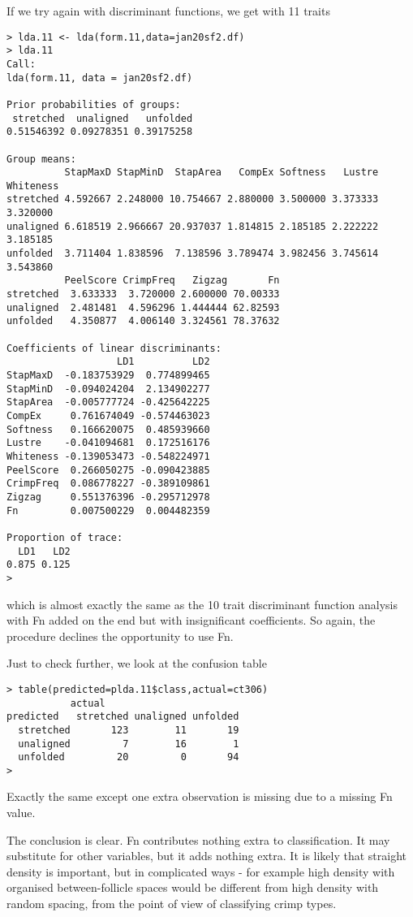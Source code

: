 \documentclass[titlepage]{article}  %
\begin{document}
If we try again with discriminant functions, we get with 11 traits
\begin{verbatim}
> lda.11 <- lda(form.11,data=jan20sf2.df)
> lda.11
Call:
lda(form.11, data = jan20sf2.df)

Prior probabilities of groups:
 stretched  unaligned   unfolded 
0.51546392 0.09278351 0.39175258 

Group means:
          StapMaxD StapMinD  StapArea   CompEx Softness   Lustre Whiteness
stretched 4.592667 2.248000 10.754667 2.880000 3.500000 3.373333  3.320000
unaligned 6.618519 2.966667 20.937037 1.814815 2.185185 2.222222  3.185185
unfolded  3.711404 1.838596  7.138596 3.789474 3.982456 3.745614  3.543860
          PeelScore CrimpFreq   Zigzag       Fn
stretched  3.633333  3.720000 2.600000 70.00333
unaligned  2.481481  4.596296 1.444444 62.82593
unfolded   4.350877  4.006140 3.324561 78.37632

Coefficients of linear discriminants:
                   LD1          LD2
StapMaxD  -0.183753929  0.774899465
StapMinD  -0.094024204  2.134902277
StapArea  -0.005777724 -0.425642225
CompEx     0.761674049 -0.574463023
Softness   0.166620075  0.485939660
Lustre    -0.041094681  0.172516176
Whiteness -0.139053473 -0.548224971
PeelScore  0.266050275 -0.090423885
CrimpFreq  0.086778227 -0.389109861
Zigzag     0.551376396 -0.295712978
Fn         0.007500229  0.004482359

Proportion of trace:
  LD1   LD2 
0.875 0.125 
> 
\end{verbatim}
 which is almost exactly the same as the 10 trait discriminant function analysis with Fn added on the end but with insignificant coefficients.
So again, the procedure declines the opportunity to use Fn.

Just to check further, we look at the confusion table
\begin{verbatim}
> table(predicted=plda.11$class,actual=ct306)
           actual
predicted   stretched unaligned unfolded
  stretched       123        11       19
  unaligned         7        16        1
  unfolded         20         0       94
> 
\end{verbatim}
 Exactly the same except one extra observation is missing due to a missing Fn value.

The conclusion is clear. Fn contributes nothing extra to classification. It may substitute for other variables, but it adds nothing extra.
It is likely that straight density is important, but in complicated ways - for example high density with organised between-follicle spaces would be different from high density with random spacing, from the point of view of classifying crimp types.
\end{document}
